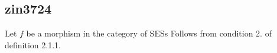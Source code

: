 \subsection{zin3724}
Let $f$ be a morphism in the category of SESs Follows from condition 2. of definition 2.1.1.